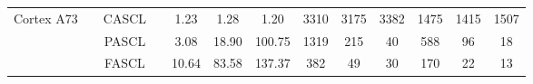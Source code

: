 \documentclass[11pt]{report}
\begin{document}
\begin{table}[h]
{{\begin{tabular}{r|c|c|c c c c| c c c| c c c}
        \hline
        \multirow{3}{*}{\begin{minipage}{0.5in}\centering Cortex A73\end{minipage}}  & \multirow{3}{*}{\begin{minipage}{0.5in}\centering 2360\end{minipage}}
                                                                                     & CASCL                                                                                 &                                            & 1.23 & 1.28                                                      & 1.20                                              & 3310                                                       & 3175         & 3382         & 1475         & 1415         & 1507                        \\
                                                                                     &                                                                                       & PASCL                                      &      & 3.08                                                      & 18.90                                             & 100.75                                                     & 1319         & 215          & 40           & 588          & 96           & 18           \\
                                                                                     &                                                                                       & FASCL                                      &      & 10.64                                                     & 83.58                                             & 137.37                                                     & 382          & 49           & 30           & 170          & 22           & 13           \\


\end{tabular}}}
\end{table}
\end{document}
